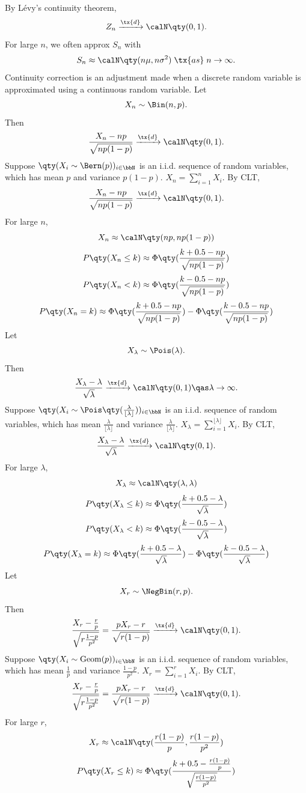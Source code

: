 \documentclass[a4paper,12pt]{report}
\begin{document}
By Lévy’s continuity theorem,
\[Z_n\xrightarrow{\tx{d}}\calN\qty(0,1).\]
\epr
For large $n$, we often approx $S_n$ with
\[S_n\approx\calN\qty(n\mu,n\sigma^2)\;\tx{as}\;n\to\infty.\]
Continuity correction is an adjustment made when a discrete random variable is approximated using a continuous random variable.
Let
\[X_n\sim\Bin(n,p).\]
Then
\[\frac{X_n-np}{\sqrt{np(1-p)}}\xrightarrow{\tx{d}}\calN\qty(0,1).\]
\bpr
Suppose $\qty(X_i\sim\Bern(p))_{i\in\bbN}$ is an i.i.d. sequence of random variables, which has mean $p$ and variance $p(1-p)$. $X_n=\sum_{i=1}^nX_i$. By CLT,
\[\frac{X_n-np}{\sqrt{np(1-p)}}\xrightarrow{\tx{d}}\calN\qty(0,1).\]
\epr
For large $n$,
\[X_n\approx\calN\qty(np,np(1-p))\]
\[P\qty(X_n\le k)\approx\Phi\qty(\frac{k+0.5-np}{\sqrt{np(1-p)}})\]
\[P\qty(X_n<k)\approx\Phi\qty(\frac{k-0.5-np}{\sqrt{np(1-p)}})\]
\[P\qty(X_n=k)\approx\Phi\qty(\frac{k+0.5-np}{\sqrt{np(1-p)}})-\Phi\qty(\frac{k-0.5-np}{\sqrt{np(1-p)}})\]
Let
\[X_{\lambda}\sim\Pois(\lambda).\]
Then
\[\frac{X_{\lambda}-\lambda}{\sqrt{\lambda}}\xrightarrow{\tx{d}}\calN\qty(0,1)\qas\lambda\to\infty.\]
\bpr
Suppose $\qty(X_i\sim\Pois\qty(\frac{\lambda}{\lfloor\lambda\rfloor}))_{i\in\bbN}$ is an i.i.d. sequence of random variables, which has mean $\frac{\lambda}{\lfloor\lambda\rfloor}$ and variance $\frac{\lambda}{\lfloor\lambda\rfloor}$. $X_{\lambda}=\sum_{i=1}^{\lfloor\lambda\rfloor}X_i$. By CLT,
\[\frac{X_{\lambda}-\lambda}{\sqrt{\lambda}}\xrightarrow{\tx{d}}\calN\qty(0,1).\]
\epr
For large $\lambda$,
\[X_{\lambda}\approx\calN\qty(\lambda,\lambda)\]
\[P\qty(X_{\lambda}\le k)\approx\Phi\qty(\frac{k+0.5-\lambda}{\sqrt{\lambda}})\]
\[P\qty(X_{\lambda}<k)\approx\Phi\qty(\frac{k-0.5-\lambda}{\sqrt{\lambda}})\]
\[P\qty(X_{\lambda}=k)\approx\Phi\qty(\frac{k+0.5-\lambda}{\sqrt{\lambda}})-\Phi\qty(\frac{k-0.5-\lambda}{\sqrt{\lambda}})\]
Let
\[X_r\sim\NegBin(r,p).\]
Then
\[\frac{X_r-\frac{r}{p}}{\sqrt{r\frac{1-p}{p^2}}}=\frac{pX_r-r}{\sqrt{r(1-p)}}\xrightarrow{\tx{d}}\calN\qty(0,1).\]
\bpr
Suppose $\qty(X_i\sim\operatorname{Geom}(p))_{i\in\bbN}$ is an i.i.d. sequence of random variables, which has mean $\frac{1}{p}$ and variance $\frac{1-p}{p^2}$. $X_r=\sum_{i=1}^rX_i$. By CLT,
\[\frac{X_r-\frac{r}{p}}{\sqrt{r\frac{1-p}{p^2}}}=\frac{pX_r-r}{\sqrt{r(1-p)}}\xrightarrow{\tx{d}}\calN\qty(0,1).\]
\epr
For large $r$,
\[X_r\approx\calN\qty(\frac{r(1-p)}{p},\frac{r(1-p)}{p^2})\]
\[P\qty(X_r\le k)\approx\Phi\qty(\frac{k+0.5-\frac{r(1-p)}{p}}{\sqrt{\frac{r(1-p)}{p^2}}})\]
\end{document}

